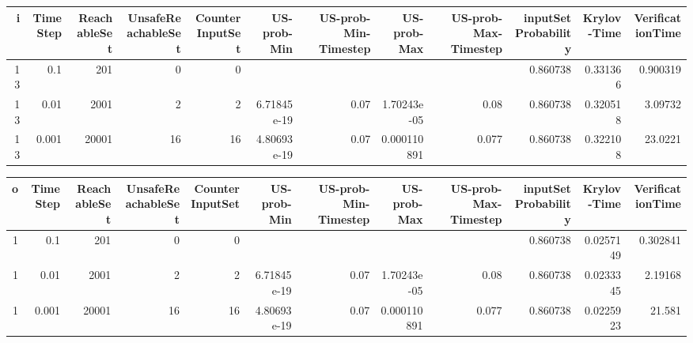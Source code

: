 
\begin{tabular}{rrrrrrrrrrrr}
\hline
   i &   TimeStep &   ReachableSet &   UnsafeReachableSet &   CounterInputSet &   US-prob-Min &   US-prob-Min-Timestep &   US-prob-Max &   US-prob-Max-Timestep &   inputSet Probability &   Krylov-Time &   VerificationTime \\
\hline
  13 &      0.1   &            201 &                    0 &                 0 &               &                        &               &                        &               0.860738 &      0.331366 &           0.900319 \\
  13 &      0.01  &           2001 &                    2 &                 2 &   6.71845e-19 &                   0.07 &   1.70243e-05 &                  0.08  &               0.860738 &      0.320518 &           3.09732  \\
  13 &      0.001 &          20001 &                   16 &                16 &   4.80693e-19 &                   0.07 &   0.000110891 &                  0.077 &               0.860738 &      0.322108 &          23.0221   \\
\hline
\end{tabular}
\begin{tabular}{rrrrrrrrrrrr}
\hline
   o &   TimeStep &   ReachableSet &   UnsafeReachableSet &   CounterInputSet &   US-prob-Min &   US-prob-Min-Timestep &   US-prob-Max &   US-prob-Max-Timestep &   inputSet Probability &   Krylov-Time &   VerificationTime \\
\hline
   1 &      0.1   &            201 &                    0 &                 0 &               &                        &               &                        &               0.860738 &     0.0257149 &           0.302841 \\
   1 &      0.01  &           2001 &                    2 &                 2 &   6.71845e-19 &                   0.07 &   1.70243e-05 &                  0.08  &               0.860738 &     0.0233345 &           2.19168  \\
   1 &      0.001 &          20001 &                   16 &                16 &   4.80693e-19 &                   0.07 &   0.000110891 &                  0.077 &               0.860738 &     0.0225923 &          21.581    \\
\hline
\end{tabular}

